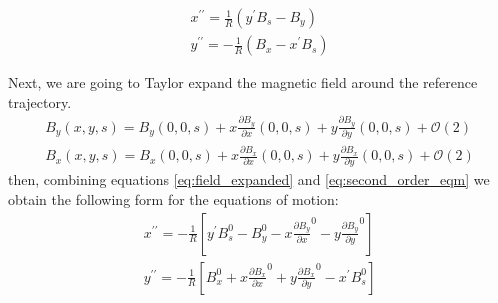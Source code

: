 \documentclass[a4paper,12pt]{article}
\begin{document}
\begin{equation}
    \begin{aligned}
        x^{\prime\prime} = \frac{1}{R}\left(y^{\prime}B_s - B_y\right)\\
        y^{\prime\prime} = -\frac{1}{R}\left(B_x - x^{\prime}B_s\right)
    \end{aligned}
    \label{eq:second_order_eqm}
\end{equation}

Next, we are going to Taylor expand the magnetic field around the reference trajectory.
\begin{equation}
    \begin{aligned}
        B_y(x, y, s) = B_y(0, 0, s) + x\frac{\partial B_y}{\partial x}(0, 0, s) + y\frac{\partial B_y}{\partial y}(0, 0, s) + \mathcal{O}(2)\\
        B_x(x, y, s) = B_x(0, 0, s) + x\frac{\partial B_x}{\partial x}(0, 0, s) + y\frac{\partial B_x}{\partial y}(0, 0, s) + \mathcal{O}(2)
    \end{aligned}
    \label{eq:field_expanded}
\end{equation}
then, combining equations \eqref{eq:field_expanded} and \eqref{eq:second_order_eqm} we obtain the following form for the equations of motion:
\begin{equation}
    \begin{aligned}
        x^{\prime\prime} = -\frac{1}{R}\left[y^{\prime}B_s^{0} - B_y^{0} - x\frac{\partial B_y}{\partial x}^{0} - y\frac{\partial B_y}{\partial y}^{0}\right]\\
        y^{\prime\prime} = -\frac{1}{R}\left[B_x^{0} + x\frac{\partial B_x}{\partial x}^{0} + y\frac{\partial B_x}{\partial y}^{0} - x^{\prime}B_s^{0}\right]
    \end{aligned}
    \label{eq:second_order_eqm_simplified}
\end{equation}
\end{document}
